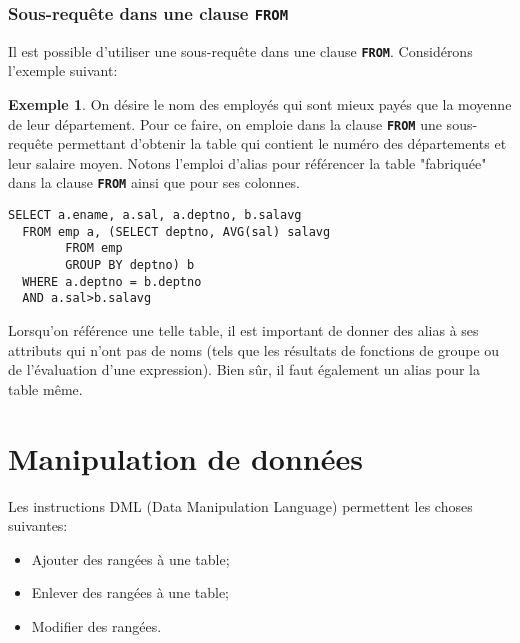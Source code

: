 \documentclass[a4paper, 12pt]{report}
\newcommand{\textSQL}[1]{\texttt{\textbf{#1}}}
\theoremstyle{definition} \newtheorem{ex}{Exemple}
\begin{document}
\subsection{Sous-requête dans une clause \textSQL{FROM}}
Il est possible d'utiliser une sous-requête dans une clause \textSQL{FROM}. Considérons l'exemple suivant:
\begin{ex}
 On désire le nom des employés qui sont mieux payés que la moyenne de leur département. Pour ce faire, on emploie dans la clause \textSQL{FROM} une sous-requête permettant d'obtenir la table qui contient le numéro des départements et leur salaire moyen. Notons l'emploi d'alias pour référencer la table "fabriquée" dans la clause \textSQL{FROM} ainsi que pour ses colonnes.
\begin{lstlisting}[frame=single]
SELECT a.ename, a.sal, a.deptno, b.salavg
  FROM emp a, (SELECT deptno, AVG(sal) salavg
	    FROM emp
	    GROUP BY deptno) b
  WHERE a.deptno = b.deptno
  AND a.sal>b.salavg
\end{lstlisting}
\end{ex}

Lorsqu'on référence une telle table, il est important de donner des alias à ses attributs qui n'ont pas de noms (tels que les résultats de fonctions de groupe ou de l'évaluation d'une expression). Bien sûr, il faut également un alias pour la table même.

\chapter{Manipulation de données}
Les instructions DML (Data Manipulation Language) permettent les choses suivantes: \begin{itemize}
\item Ajouter des rangées à une table;
\item Enlever des rangées à une table;
\item Modifier des rangées. \end{itemize}
\end{document}
